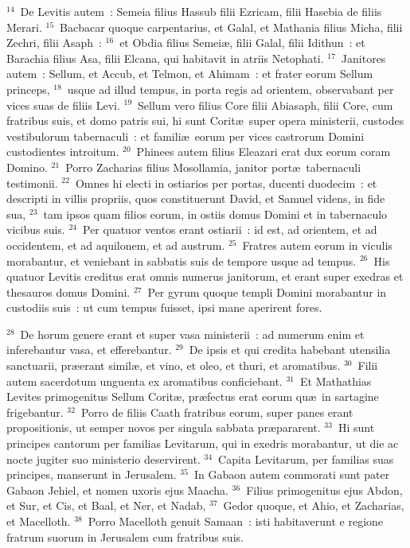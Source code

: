 ${}^{14}$~De Levitis autem~: Semeia filius Hassub filii Ezricam, filii Hasebia de filiis Merari.
${}^{15}$~Bacbacar quoque carpentarius, et Galal, et Mathania filius Micha, filii Zechri, filii Asaph~:
${}^{16}$~et Obdia filius Semei\ae , filii Galal, filii Idithun~: et Barachia filius Asa, filii Elcana, qui habitavit in atriis Netophati.
${}^{17}$~Janitores autem~: Sellum, et Accub, et Telmon, et Ahimam~: et frater eorum Sellum princeps,
${}^{18}$~usque ad illud tempus, in porta regis ad orientem, observabant per vices suas de filiis Levi.
${}^{19}$~Sellum vero filius Core filii Abiasaph, filii Core, cum fratribus suis, et domo patris sui, hi sunt Corit\ae\ super opera ministerii, custodes vestibulorum tabernaculi~: et famili\ae\ eorum per vices castrorum Domini custodientes introitum.
${}^{20}$~Phinees autem filius Eleazari erat dux eorum coram Domino.
${}^{21}$~Porro Zacharias filius Mosollamia, janitor port\ae\ tabernaculi testimonii.
${}^{22}$~Omnes hi electi in ostiarios per portas, ducenti duodecim~: et descripti in villis propriis, quos constituerunt David, et Samuel videns, in fide sua,
${}^{23}$~tam ipsos quam filios eorum, in ostiis domus Domini et in tabernaculo vicibus suis.
${}^{24}$~Per quatuor ventos erant ostiarii~: id est, ad orientem, et ad occidentem, et ad aquilonem, et ad austrum.
${}^{25}$~Fratres autem eorum in viculis morabantur, et veniebant in sabbatis suis de tempore usque ad tempus.
${}^{26}$~His quatuor Levitis creditus erat omnis numerus janitorum, et erant super exedras et thesauros domus Domini.
${}^{27}$~Per gyrum quoque templi Domini morabantur in custodiis suis~: ut cum tempus fuisset, ipsi mane aperirent fores.


${}^{28}$~De horum genere erant et super vasa ministerii~: ad numerum enim et inferebantur vasa, et efferebantur.
${}^{29}$~De ipsis et qui credita habebant utensilia sanctuarii, pr\ae erant simil\ae , et vino, et oleo, et thuri, et aromatibus.
${}^{30}$~Filii autem sacerdotum unguenta ex aromatibus conficiebant.
${}^{31}$~Et Mathathias Levites primogenitus Sellum Corit\ae , pr\ae fectus erat eorum qu\ae\ in sartagine frigebantur.
${}^{32}$~Porro de filiis Caath fratribus eorum, super panes erant propositionis, ut semper novos per singula sabbata pr\ae pararent.
${}^{33}$~Hi sunt principes cantorum per familias Levitarum, qui in exedris morabantur, ut die ac nocte jugiter suo ministerio deservirent.
${}^{34}$~Capita Levitarum, per familias suas principes, manserunt in Jerusalem.
${}^{35}$~In Gabaon autem commorati sunt pater Gabaon Jehiel, et nomen uxoris ejus Maacha.
${}^{36}$~Filius primogenitus ejus Abdon, et Sur, et Cis, et Baal, et Ner, et Nadab,
${}^{37}$~Gedor quoque, et Ahio, et Zacharias, et Macelloth.
${}^{38}$~Porro Macelloth genuit Samaan~: isti habitaverunt e regione fratrum suorum in Jerusalem cum fratribus suis.


